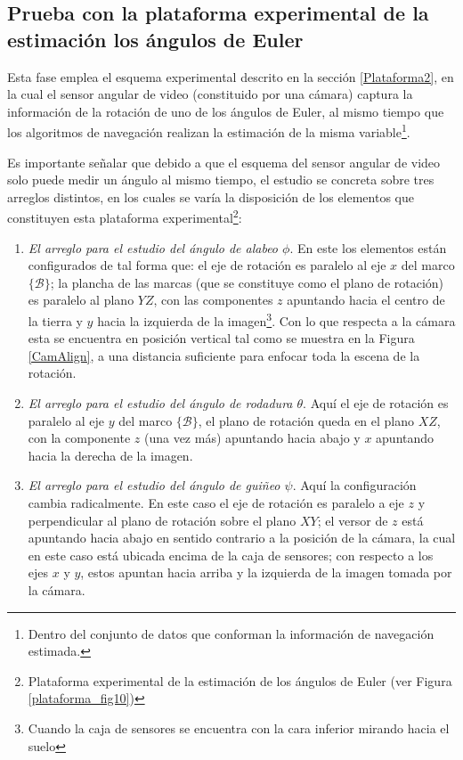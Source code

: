 \documentclass[10pt]{report}
\numberwithin{equation}{chapter}
\numberwithin{algorithm}{chapter}
\newcommand{\marco}[1]{\{\mathcal{#1}\}}
\begin{document}
\subsection{Prueba con la plataforma experimental de la estimación los ángulos de Euler}
Esta fase emplea el esquema experimental descrito en la sección \ref{Plataforma2}, en la cual el sensor angular de video (constituido por una cámara) captura la información de la rotación de uno de los ángulos de Euler, al mismo tiempo que los algoritmos de navegación realizan la estimación de la misma variable\footnote{Dentro del conjunto de datos que conforman la información de navegación estimada.}.\par
Es importante señalar que debido a que el esquema del sensor angular de video solo puede medir un ángulo al mismo tiempo, el estudio se concreta sobre tres arreglos distintos, en los cuales se varía la disposición de los elementos que constituyen esta plataforma experimental\footnote{Plataforma experimental de la estimación de los ángulos de Euler (ver Figura \ref{plataforma_fig10})}:
\begin{enumerate}
\item \emph{El arreglo para el estudio del ángulo de alabeo $\phi$}. En este los elementos están configurados de tal forma que: el eje de rotación es paralelo al eje $x$ del marco $\marco{B}$; la plancha de las marcas (que se constituye como el plano de rotación) es paralelo al plano $YZ$, con las componentes $z$ apuntando hacia el centro de la tierra y $y$ hacia la izquierda de la imagen\footnote{Cuando la caja de sensores se encuentra con la cara inferior mirando hacia el suelo}. Con lo que respecta a la cámara esta se encuentra en posición vertical tal como se muestra en la Figura \ref{CamAlign}, a una distancia suficiente para enfocar toda la escena de la rotación.
\item \emph{El arreglo para el estudio del ángulo de rodadura $\theta$}. Aquí el eje de rotación es paralelo al eje $y$ del marco $\marco{B}$, el plano de rotación queda en el plano $XZ$, con la componente $z$ (una vez más) apuntando hacia abajo y $x$ apuntando hacia la derecha de la imagen.
\item \emph{El arreglo para el estudio del ángulo de guiñeo $\psi$}. Aquí la configuración cambia radicalmente. En este caso el eje de rotación es paralelo a eje $z$ y perpendicular al plano de rotación sobre el plano $XY$; el versor de $z$ está apuntando hacia abajo en sentido contrario a la posición de la cámara, la cual en este caso está ubicada encima de la caja de sensores; con respecto a los ejes $x$ y $y$, estos apuntan hacia arriba y la izquierda de la imagen tomada por la cámara.
\end{enumerate}
\end{document}
